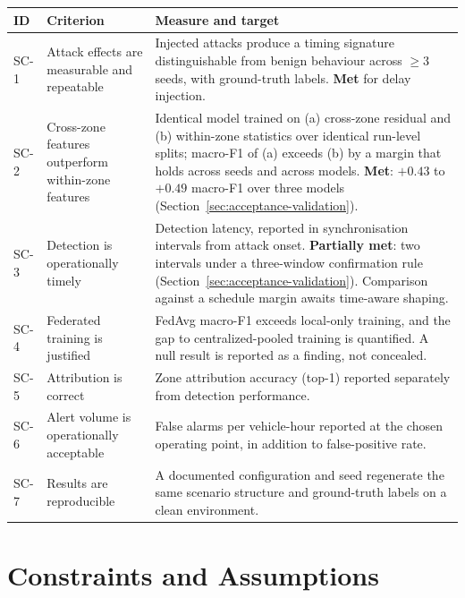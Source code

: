 \begin{longtable}{p{} p{} p{}}
\toprule
\textbf{ID} & \textbf{Criterion} & \textbf{Measure and target} \\
\midrule
\endhead
SC-1 & Attack effects are measurable and repeatable &
Injected attacks produce a timing signature distinguishable from benign behaviour
across $\geq$3 seeds, with ground-truth labels. \textbf{Met} for delay injection. \\
\addlinespace
SC-2 & Cross-zone features outperform within-zone features &
Identical model trained on (a) cross-zone residual and (b) within-zone statistics over
identical run-level splits; macro-F1 of (a) exceeds (b) by a margin that holds across
seeds and across models. \textbf{Met}: $+0.43$ to $+0.49$ macro-F1 over three models
(Section~\ref{sec:acceptance-validation}). \\
\addlinespace
SC-3 & Detection is operationally timely &
Detection latency, reported in synchronisation intervals from attack onset.
\textbf{Partially met}: two intervals under a three-window confirmation rule
(Section~\ref{sec:acceptance-validation}). Comparison against a schedule margin awaits time-aware shaping. \\
\addlinespace
SC-4 & Federated training is justified &
FedAvg macro-F1 exceeds local-only training, and the gap to centralized-pooled
training is quantified. A null result is reported as a finding, not concealed. \\
\addlinespace
SC-5 & Attribution is correct &
Zone attribution accuracy (top-1) reported separately from detection performance. \\
\addlinespace
SC-6 & Alert volume is operationally acceptable &
False alarms per vehicle-hour reported at the chosen operating point, in addition to
false-positive rate. \\
\addlinespace
SC-7 & Results are reproducible &
A documented configuration and seed regenerate the same scenario structure and
ground-truth labels on a clean environment. \\
\bottomrule
\end{longtable}

\section{Constraints and Assumptions}
\label{sec:assumptions}

